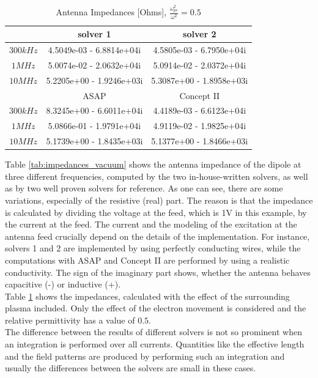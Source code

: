 \documentclass[draft,ras]{agutex}
\begin{document}
\begin{article}
\begin{table}
\caption{Antenna Impedances [Ohms], $\frac{\omega_{pe}^2}{\omega^2}=0.5$}
\label{tab:impedances_plasma}
\begin{tabular}{|c|c|c|}
 \hline
 & solver 1  & solver 2  \\
\hline
$300 kHz$ & 4.5049e-03 - 6.8814e+04i & 4.5805e-03 - 6.7950e+04i  \\
$1 MHz$ &  5.0074e-02 - 2.0632e+04i &  5.0914e-02 - 2.0372e+04i \\
$10 MHz$ & 5.2205e+00 - 1.9246e+03i &  5.3087e+00 - 1.8958e+03i \\
\hline
& ASAP  & Concept II  \\
\hline
$300 kHz$ & 8.3245e+00 - 6.6011e+04i &  4.4189e-03 - 6.6123e+04i \\
$1 MHz$ & 5.0866e-01 - 1.9791e+04i &  4.9119e-02 - 1.9825e+04i \\
$10 MHz$ &  5.1739e+00 - 1.8435e+03i&  5.1377e+00 - 1.8466e+03i \\
\hline
\end{tabular}
\end{table}

Table \ref{tab:impedances_vacuum} shows the antenna impedance of the dipole at three different frequencies, computed by the two in-house-written solvers, as well as by two well proven solvers for reference. As one can see, there are some variations, especially of the resistive (real) part. The reason is that the impedance is calculated by dividing the voltage at the feed, which is 1V in this example, by the current at the feed. The current and the modeling of the excitation at the antenna feed crucially depend on the details of the implementation. For instance, solvers 1 and 2 are implemented by using perfectly conducting wires, while the computations with ASAP and Concept II are performed by using a realistic conductivity. The sign of the imaginary part shows, whether the antenna behaves capacitive (-) or inductive (+).\\

Table \ref{tab:impedances_plasma} shows the impedances, calculated with the effect of the surrounding plasma included. Only the effect of the electron movement is considered and the relative permittivity has a value of $0.5$.\\

The difference between the results of different solvers is not so prominent when an integration is performed over all currents. Quantities like the effective length and the field patterns are produced by performing such an integration and usually the differences between the solvers are small in these cases.\\



\end{article}
\end{document}
